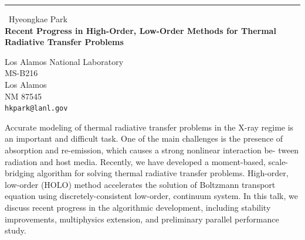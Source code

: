 \documentclass{report}
\begin{document}
\begin{center}
\rule{6in}{1pt} \
{\large Hyeongkae Park \\
{\bf Recent Progress in High-Order, Low-Order Methods for Thermal Radiative Transfer Problems}}

Los Alamos National Laboratory \\ MS-B216 \\ Los Alamos \\ NM 87545
\\
{\tt hkpark@lanl.gov}\end{center}

Accurate modeling of thermal radiative transfer problems in the X-ray
regime is an important and difficult task. One of the main challenges is
the presence of absorption and re-emission, which causes a strong
nonlinear interaction be- tween radiation and host media. Recently, we
have developed a moment-based, scale-bridging algorithm for solving
thermal radiative transfer problems. High-order, low-order (HOLO) method
accelerates the solution of Boltzmann transport equation using
discretely-consistent low-order, continuum system. In this talk, we
discuss recent progress in the algorithmic development, including
stability improvements, multiphysics extension, and preliminary parallel
performance study.
\end{document}
